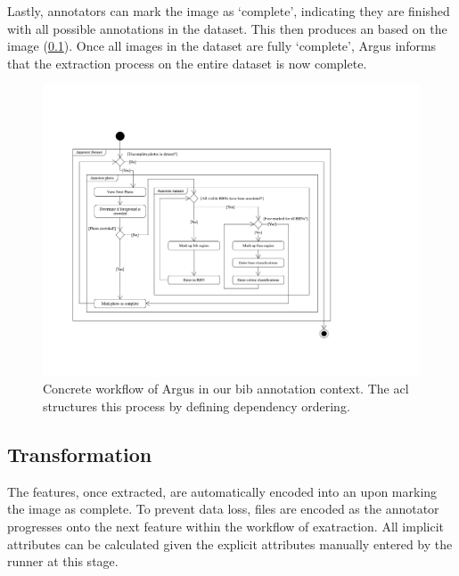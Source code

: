 Lastly, annotators can mark the image as `complete', indicating they are finished with all possible annotations in the dataset. This then produces an  based on the image (\cref{sec:dataset:process:transformation}). Once all images in the dataset are fully `complete', Argus informs that the extraction process on the entire dataset is now complete.

\begin{landscape}
\begin{figure}[p]
  \centering
  \includegraphics[width=0.9\paperwidth]{images/dataset/concrete_workflow}
  \caption[Concrete workflow example using Argus]{Concrete workflow of Argus in our bib annotation context. The \gls{acl} structures this process by defining dependency ordering.}
  \label{fig:dataset:process:argus_workflow}
\end{figure}
\end{landscape}

\subsection{Transformation}
\label{sec:dataset:process:transformation}

The features, once extracted, are automatically encoded into an  upon marking the image as complete. To prevent data loss, files are encoded as the annotator progresses onto the next feature within the workflow of exatraction. All implicit attributes can be calculated given the explicit attributes manually entered by the runner at this stage.

